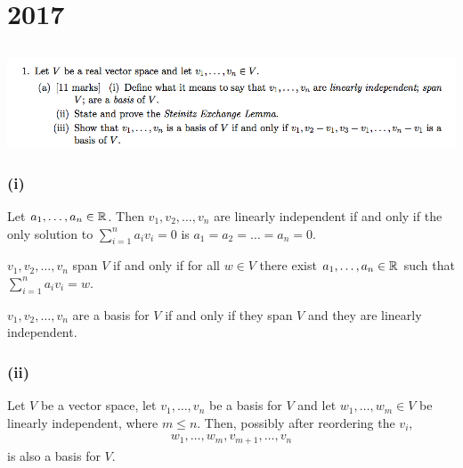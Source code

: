 \documentclass[12pt]{article}
\begin{document}
\section{2017}

\subsection*{}  %
\begin{mdframed}
\includegraphics[width=400pt]{img/oxford-prelims-2017-A-1-1.png}
\end{mdframed}

\subsubsection*{(i)}
\begin{definition*}
  Let $a_1, \ldots, a_n \in \mathbb{R}$. Then $v_1, v_2, \ldots, v_n$ are linearly
  independent if and only if the only solution to $\sum_{i=1}^n a_iv_i = 0$ is
  $a_1 = a_2 = \ldots = a_n = 0$.
\end{definition*}

\begin{definition*}[Span]
  $v_1, v_2, \ldots, v_n$ span $V$ if and only if for all $w \in V$ there exist
  $a_1, \ldots, a_n \in \mathbb{R}$ such that $\sum_{i=1}^n a_iv_i = w$.
\end{definition*}

\begin{definition*}[Basis]
  $v_1, v_2, \ldots, v_n$ are a basis for $V$ if and only if they span $V$ and
  they are linearly independent.
\end{definition*}

\subsubsection*{(ii)}

\begin{theorem*}
  Let $V$ be a vector space, let $v_1, \ldots, v_n$ be a basis for $V$ and
  let $w_1, \ldots, w_m \in V$ be linearly independent, where $m \leq
  n$. Then, possibly after reordering the $v_i$,
  \begin{align*}
    w_1, \ldots, w_m, v_{m+1}, \ldots, v_n
  \end{align*}
  is also a basis for $V$.
\end{theorem*}
\end{document}
